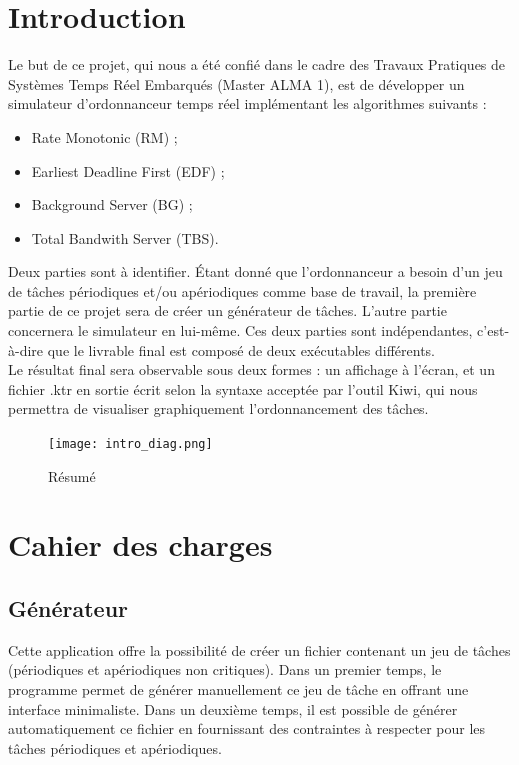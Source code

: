 \chapter*{Introduction}

	Le but de ce projet, qui nous a été confié dans le cadre des Travaux Pratiques de Systèmes Temps Réel Embarqués (Master ALMA 1), est de développer un simulateur d'ordonnanceur temps réel implémentant les algorithmes suivants :
	\begin{itemize}
		\item Rate Monotonic (RM) ;
		\item Earliest Deadline First (EDF) ;
		\item Background Server (BG) ;
		\item Total Bandwith Server (TBS).
	\end{itemize}
	
	Deux parties sont à identifier. Étant donné que l'ordonnanceur a besoin d'un jeu de tâches périodiques et/ou apériodiques comme base de travail, la première partie de ce projet sera de créer un générateur de tâches. L'autre partie concernera le simulateur en lui-même. Ces deux parties sont indépendantes, c'est-à-dire que le livrable final est composé de deux exécutables différents.\\
	
	Le résultat final sera observable sous deux formes : un affichage à l'écran, et un fichier .ktr en sortie écrit selon la syntaxe acceptée par l'outil Kiwi, qui nous permettra de visualiser graphiquement l'ordonnancement des tâches.
	\begin{figure}[h!]
		\centering
		\texttt{[image: intro\_diag.png]}
		\caption{Résumé}
	\end{figure}
	\FloatBarrier


\chapter{Cahier des charges}
	
	\section{Générateur}
		Cette application offre la possibilité de créer un fichier contenant un jeu de tâches (périodiques et apériodiques non critiques).
		Dans un premier temps, le programme permet de générer manuellement ce jeu de tâche en offrant une interface minimaliste.
		Dans un deuxième temps, il est possible de générer automatiquement ce fichier en fournissant des contraintes à respecter pour les tâches périodiques et apériodiques.
	
